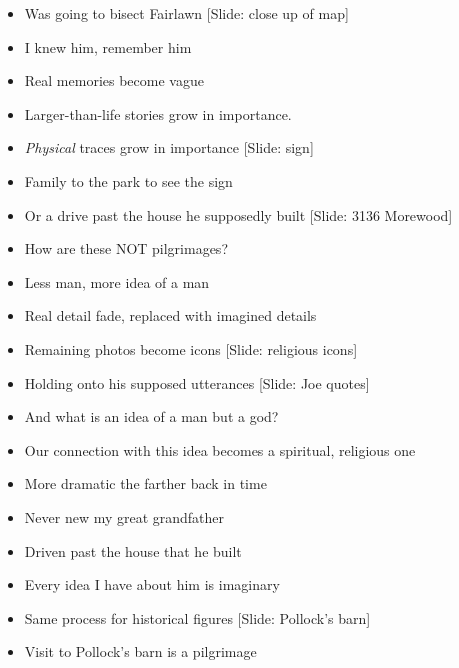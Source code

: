 \documentclass[12pt]{article}
\begin{document}
{\begin{itemize}
\item Was going to bisect Fairlawn [Slide: close up of map]

\item I knew him, remember him

\item Real memories become vague

\item Larger-than-life stories grow in importance.

\item {\em Physical} traces grow in importance [Slide: sign]

\item Family to the park to see the sign

\item Or a drive past the house he supposedly built [Slide: 3136 Morewood]

\item How are these NOT pilgrimages?

\item Less man, more idea of a man

\item Real detail fade, replaced with imagined details

\item Remaining photos become icons [Slide: religious icons]

\item Holding onto his supposed utterances [Slide: Joe quotes]

\item And what is an idea of a man but a god?

\item Our connection with this idea becomes a spiritual, religious one

\item More dramatic the farther back in time

\item Never new my great grandfather

\item Driven past the house that he built

\item Every idea I have about him is imaginary

\item Same process for historical figures [Slide: Pollock's barn]

\item Visit to Pollock's barn is a pilgrimage


\end{itemize}}
\end{document}
